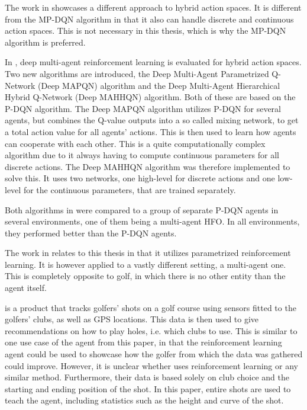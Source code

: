 \documentclass{kththesis}
\begin{document}
The work in \textcite{delalleau2019discrete} showcases a different approach to hybrid action spaces. It is different from the MP-DQN algorithm in that it also can handle discrete and continuous action spaces. This is not necessary in this thesis, which is why the MP-DQN algorithm is preferred.

In \textcite{fu2019deep}, deep multi-agent reinforcement learning is evaluated for hybrid action spaces. Two new algorithms are introduced, the Deep Multi-Agent Parametrized Q-Network (Deep MAPQN) algorithm and the Deep Multi-Agent Hierarchical Hybrid Q-Network (Deep MAHHQN) algorithm. Both of these are based on the P-DQN algorithm. The Deep MAPQN algorithm utilizes P-DQN for several agents, but combines the Q-value outputs into a so called mixing network, to get a total action value for all agents' actions. This is then used to learn how agents can cooperate with each other. This is a quite computationally complex algorithm due to it always having to compute continuous parameters for all discrete actions. The Deep MAHHQN algorithm was therefore implemented to solve this. It uses two networks, one high-level for discrete actions and one low-level for the continuous parameters, that are trained separately. 

Both algorithms in \textcite{fu2019deep} were compared to a group of separate P-DQN agents in several environments, one of them being a multi-agent HFO. In all environments, they performed better than the P-DQN agents. 

The work in \textcite{fu2019deep} relates to this thesis in that it utilizes parametrized reinforcement learning. It is however applied to a vastly different setting, a multi-agent one. This is completely opposite to golf, in which there is no other entity than the agent itself.

\textcite{ArccosGo0:online} is a product that tracks golfers' shots on a golf course using sensors fitted to the golfers' clubs, as well as GPS locations. This data is then used to give recommendations on how to play holes, i.e. which clubs to use. This is similar to one use case of the agent from this paper, in that the reinforcement learning agent could be used to showcase how the golfer from which the data was gathered could improve. However, it is unclear whether \textcite{ArccosGo0:online} uses reinforcement learning or any similar method. Furthermore, their data is based solely on club choice and the starting and ending position of the shot. In this paper, entire shots are used to teach the agent, including statistics such as the height and curve of the shot.
\end{document}
